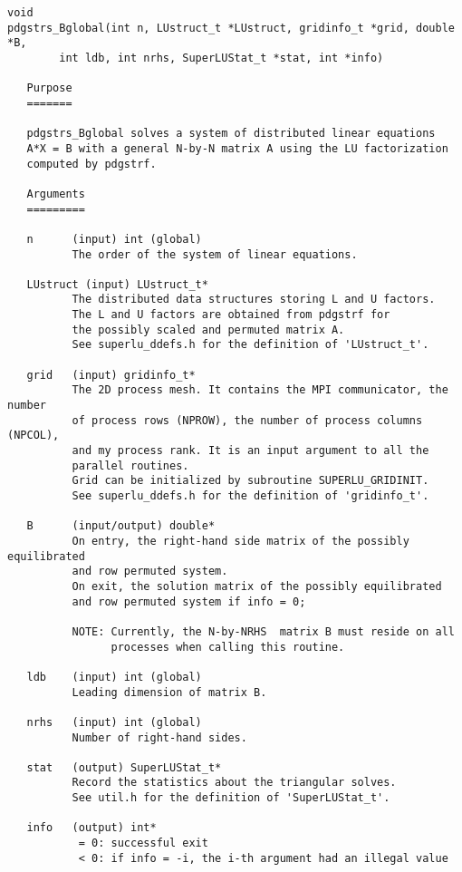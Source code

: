 \begin{verbatim}
void
pdgstrs_Bglobal(int n, LUstruct_t *LUstruct, gridinfo_t *grid, double *B,
		int ldb, int nrhs, SuperLUStat_t *stat, int *info)

   Purpose
   =======
  
   pdgstrs_Bglobal solves a system of distributed linear equations
   A*X = B with a general N-by-N matrix A using the LU factorization
   computed by pdgstrf.
   
   Arguments
   =========
  
   n      (input) int (global)
          The order of the system of linear equations.
  
   LUstruct (input) LUstruct_t*
          The distributed data structures storing L and U factors.
          The L and U factors are obtained from pdgstrf for
          the possibly scaled and permuted matrix A.
          See superlu_ddefs.h for the definition of 'LUstruct_t'.
  
   grid   (input) gridinfo_t*
          The 2D process mesh. It contains the MPI communicator, the number
          of process rows (NPROW), the number of process columns (NPCOL),
          and my process rank. It is an input argument to all the
          parallel routines.
          Grid can be initialized by subroutine SUPERLU_GRIDINIT.
          See superlu_ddefs.h for the definition of 'gridinfo_t'.
  
   B      (input/output) double*
          On entry, the right-hand side matrix of the possibly equilibrated
          and row permuted system.
          On exit, the solution matrix of the possibly equilibrated
          and row permuted system if info = 0;
  
          NOTE: Currently, the N-by-NRHS  matrix B must reside on all 
                processes when calling this routine.
  
   ldb    (input) int (global)
          Leading dimension of matrix B.
  
   nrhs   (input) int (global)
          Number of right-hand sides.
  
   stat   (output) SuperLUStat_t*
          Record the statistics about the triangular solves.
          See util.h for the definition of 'SuperLUStat_t'.
  
   info   (output) int*
           = 0: successful exit
           < 0: if info = -i, the i-th argument had an illegal value

\end{verbatim}


